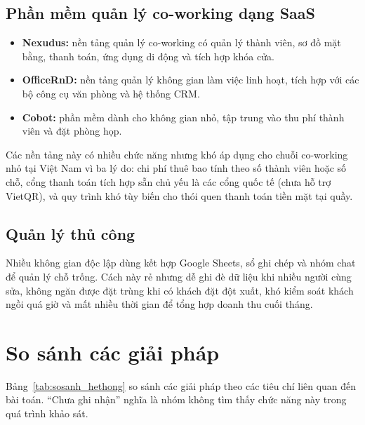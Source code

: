 \subsection{Phần mềm quản lý co-working dạng SaaS}
\begin{itemize}
    \item \textbf{Nexudus:} nền tảng quản lý co-working có quản lý thành viên, sơ đồ mặt bằng, thanh toán, ứng dụng di động và tích hợp khóa cửa.
    \item \textbf{OfficeRnD:} nền tảng quản lý không gian làm việc linh hoạt, tích hợp với các bộ công cụ văn phòng và hệ thống CRM.
    \item \textbf{Cobot:} phần mềm dành cho không gian nhỏ, tập trung vào thu phí thành viên và đặt phòng họp.
\end{itemize}
Các nền tảng này có nhiều chức năng nhưng khó áp dụng cho chuỗi co-working nhỏ tại Việt Nam vì ba lý do: chi phí thuê bao tính theo số thành viên hoặc số chỗ, cổng thanh toán tích hợp sẵn chủ yếu là các cổng quốc tế (chưa hỗ trợ VietQR), và quy trình khó tùy biến cho thói quen thanh toán tiền mặt tại quầy.

\subsection{Quản lý thủ công}
Nhiều không gian độc lập dùng kết hợp Google Sheets, sổ ghi chép và nhóm chat để quản lý chỗ trống. Cách này rẻ nhưng dễ ghi đè dữ liệu khi nhiều người cùng sửa, không ngăn được đặt trùng khi có khách đặt đột xuất, khó kiểm soát khách ngồi quá giờ và mất nhiều thời gian để tổng hợp doanh thu cuối tháng.

\section{So sánh các giải pháp}
\label{sec:sosanh}

Bảng~\ref{tab:sosanh_hethong} so sánh các giải pháp theo các tiêu chí liên quan đến bài toán. ``Chưa ghi nhận'' nghĩa là nhóm không tìm thấy chức năng này trong quá trình khảo sát.

